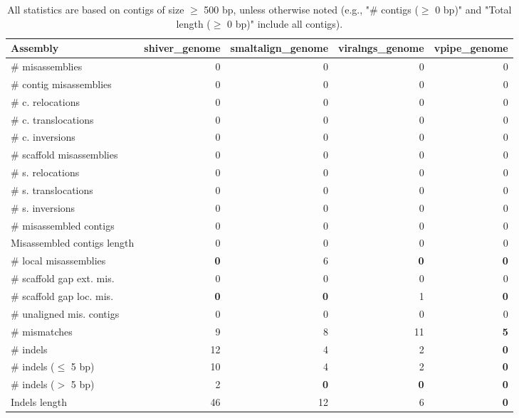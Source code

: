 \documentclass[12pt,a4paper]{article}
\begin{document}
\begin{table}[ht]
\begin{center}
\caption{All statistics are based on contigs of size $\geq$ 500 bp, unless otherwise noted (e.g., "\# contigs ($\geq$ 0 bp)" and "Total length ($\geq$ 0 bp)" include all contigs).}
\begin{tabular}{|l*{4}{|r}|}
\hline
Assembly & shiver\_genome & smaltalign\_genome & viralngs\_genome & vpipe\_genome \\ \hline
\# misassemblies & 0 & 0 & 0 & 0 \\ \hline
\hspace{2mm}\# contig misassemblies & 0 & 0 & 0 & 0 \\ \hline
\hspace{5mm}\# c. relocations & 0 & 0 & 0 & 0 \\ \hline
\hspace{5mm}\# c. translocations & 0 & 0 & 0 & 0 \\ \hline
\hspace{5mm}\# c. inversions & 0 & 0 & 0 & 0 \\ \hline
\hspace{2mm}\# scaffold misassemblies & 0 & 0 & 0 & 0 \\ \hline
\hspace{5mm}\# s. relocations & 0 & 0 & 0 & 0 \\ \hline
\hspace{5mm}\# s. translocations & 0 & 0 & 0 & 0 \\ \hline
\hspace{5mm}\# s. inversions & 0 & 0 & 0 & 0 \\ \hline
\# misassembled contigs & 0 & 0 & 0 & 0 \\ \hline
Misassembled contigs length & 0 & 0 & 0 & 0 \\ \hline
\# local misassemblies & {\bf 0} & 6 & {\bf 0} & {\bf 0} \\ \hline
\# scaffold gap ext. mis. & 0 & 0 & 0 & 0 \\ \hline
\# scaffold gap loc. mis. & {\bf 0} & {\bf 0} & 1 & {\bf 0} \\ \hline
\# unaligned mis. contigs & 0 & 0 & 0 & 0 \\ \hline
\# mismatches & 9 & 8 & 11 & {\bf 5} \\ \hline
\# indels & 12 & 4 & 2 & {\bf 0} \\ \hline
\hspace{5mm}\# indels ($\leq$ 5 bp) & 10 & 4 & 2 & {\bf 0} \\ \hline
\hspace{5mm}\# indels ($>$ 5 bp) & 2 & {\bf 0} & {\bf 0} & {\bf 0} \\ \hline
Indels length & 46 & 12 & 6 & {\bf 0} \\ \hline
\end{tabular}
\end{center}
\end{table}
\end{document}

